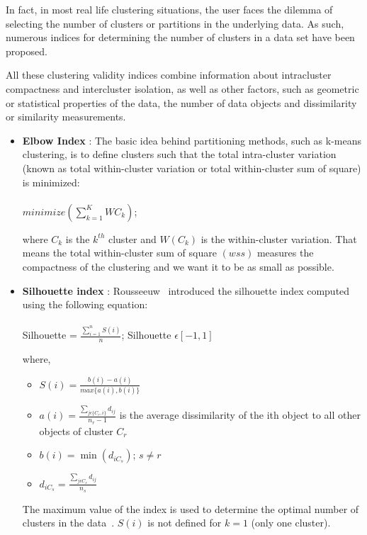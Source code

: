 In fact, in most real life clustering situations, the user faces the dilemma of selecting the number
of clusters or partitions in the underlying data. As such, numerous indices for determining
the number of clusters in a data set have been proposed.

All these clustering validity indices combine information about intracluster compactness and
intercluster isolation, as well as other factors, such as geometric or statistical properties of
the data, the number of data objects and dissimilarity or similarity measurements.

\begin{itemize}
\item \textbf{Elbow Index} : The basic idea behind partitioning methods, such as k-means clustering,
is to define clusters such that the total intra-cluster variation (known as total within-cluster
variation or total within-cluster sum of square) is minimized:\\\\
$minimize(\sum_{k=1}^{K}WC_k)$;

where $C_k$ is the $k^{th}$ cluster and $W(C_k)$ is the within-cluster variation.
That means the total within-cluster sum of square $(wss)$ measures the compactness of the clustering and we want
it to be as small as possible.

\item \textbf{Silhouette index} : Rousseeuw~\cite{rousseeuw87} introduced the silhouette index computed using
the following equation:\\\\
Silhouette = $\frac{\sum_{i=1}^{n}S(i)}{n}$; Silhouette $\epsilon{[-1, 1]}$

where,
\begin{itemize}
\item $S(i) = \frac{b(i)−a(i)}{max\{a(i), b(i)\}}$
\item $a(i) = \frac{\sum_{j\epsilon\{C_r, i\}}d_{ij}}{n_r - 1}$ is the average dissimilarity of the ith object
to all other objects of cluster $C_r$
\item $b(i) = \min(d_{iC_{s}})$; $s \neq r$
\item $d_{iC_{s}} = \frac{\sum_{j \epsilon C_{s}}d_{ij}}{n_{s}}$
\end{itemize}

The maximum value of the index is used to determine the optimal number of clusters in the
data~\cite{rousseeuw90}. $S(i)$ is not defined for $k = 1$ (only one cluster).


\end{itemize}
